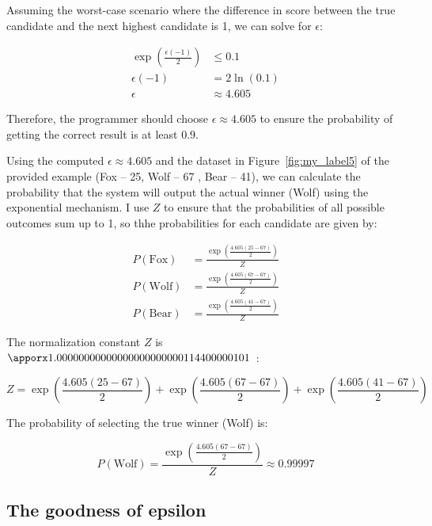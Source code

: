 Assuming the worst-case scenario where the difference in
score between the true candidate and the next highest candidate is 1, we can solve for $\epsilon$:

\begin{align*}
  \exp\left(\frac{\epsilon(-1)}{2}\right) &\leq 0.1 \\
  \epsilon(-1) &= 2\ln(0.1) \\
  \epsilon &\approx 4.605
\end{align*}

Therefore, the programmer should choose $\epsilon \approx 4.605$ to ensure the probability of getting the correct result is at least 0.9.

Using the computed $\epsilon \approx 4.605$ and the dataset in Figure~\ref{fig:my_label5} of the provided example (Fox -- 25, Wolf -- 67
, Bear -- 41), we
can
calculate
the
probability that the system will output the actual winner (Wolf) using the exponential mechanism. I use $Z$ to
ensure
that the probabilities of all possible outcomes sum up to 1, so thhe
probabilities for each candidate
are given by:

\begin{align*}
  P(\text{Fox}) &= \frac{\exp\left(\frac{4.605(25 - 67)}{2}\right)}{Z} \\
  P(\text{Wolf}) &= \frac{\exp\left(\frac{4.605(67 - 67)}{2}\right)}{Z} \\
  P(\text{Bear}) &= \frac{\exp\left(\frac{4.605(41 - 67)}{2}\right)}{Z}
\end{align*}

The normalization constant $Z$ is $\apporx 1.00000000000000000000000114400000101$~\cite[]{norm_Z}:

\begin{equation}
  Z = \exp\left(\frac{4.605(25 - 67)}{2}\right) + \exp\left(\frac{4.605(67 - 67)}{2}\right) + \exp\left(\frac{4.605(41 - 67)}{2}\right)
\end{equation}

The probability of selecting the true winner (Wolf) is:

\begin{equation}
  P(\text{Wolf}) = \frac{\exp\left(\frac{4.605(67 - 67)}{2}\right)}{Z} \approx 0.99997
\end{equation}

\subsection{The goodness of epsilon}

